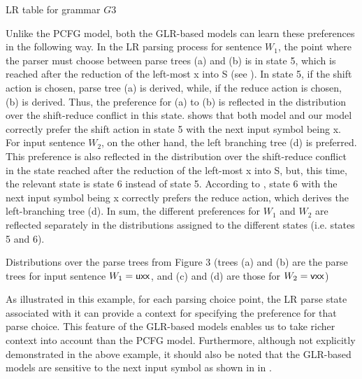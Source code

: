 \documentclass[a4j]{article}
\def\BC{}
\def\sec#1{}
\def\fig#1{}
\def\tbl#1{}
\def\eq#1{}
\begin{document}
\begin{table}[tp]
  \begin{center}
    \leavevmode
    \caption{LR table for grammar $G3$}
    \label{tbl:LR-table3}
    \small
    
  \end{center}
\end{table}

Unlike the PCFG model, both the GLR-based models can learn these
preferences in the following way. In the LR parsing process for sentence
$W_1$, the point where the parser must choose between parse trees (a)
and (b) is in state 5, which is reached after the reduction of the
left-most {\sf x} into {\sf S} (see \fig{trees3}). In state 5, if the
shift action is chosen, parse tree (a) is derived, while, if the reduce
action is chosen, (b) is derived. Thus, the preference for (a) to (b) is
reflected in the distribution over the shift-reduce conflict in this
state. \tbl{LR-table3} shows that both \BC model and our model correctly
prefer the shift action in state 5 with the next input symbol being {\sf
x}. For input sentence $W_2$, on the other hand, the left branching tree
(d) is preferred. This preference is also reflected in the distribution
over the shift-reduce conflict in the state reached after the reduction
of the left-most {\sf x} into {\sf S}, but, this time, the relevant
state is state 6 instead of state 5. According to \tbl{LR-table3}, state
6 with the next input symbol being {\sf x} correctly prefers the reduce
action, which derives the left-branching tree (d). In sum, the different
preferences for $W_1$ and $W_2$ are reflected separately in the
distributions assigned to the different states (i.e. states 5 and 6).

\begin{table}[t]
  \begin{center}
    \leavevmode
    \caption{Distributions over the parse trees from Figure 3 (trees 
      (a) and (b) are the parse trees for input sentence
      $W_1={\sf uxx}$, and (c) and (d) are those for
      $W_2={\sf vxx}$)}
    \label{tbl:result3}
    
  \end{center}
\end{table}
As illustrated in this example, for each parsing choice point, the LR
parse state associated with it can provide a context for specifying the
preference for that parse choice. This feature of the GLR-based models
enables us to take richer context into account than the PCFG
model. Furthermore, although not explicitly demonstrated in the above
example, it should also be noted that the GLR-based models are sensitive
to the next input symbol as shown in \eq{a1} in \sec{PGLR}.
\end{document}
